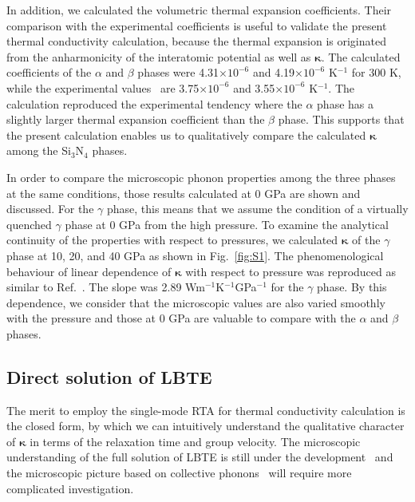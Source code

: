 \documentclass[twocolumn,amsmath,amssymb,a4paper,prb,superscriptaddress,floatfix]{revtex4-1}
\begin{document}
In addition, we calculated the volumetric thermal expansion coefficients. Their
comparison with the experimental coefficients is useful to validate the present
thermal conductivity calculation, because the thermal expansion is originated
from the anharmonicity of the interatomic potential as well as
$\boldsymbol{\kappa}$. The calculated coefficients of the $\alpha$ and $\beta$
phases were 4.31$\times 10^{-6}$ and 4.19$\times 10^{-6}$ K$^{-1}$ for 300 K,
while the experimental values~\cite{minikayev-alpha} are 3.75$\times 10^{-6}$
and 3.55$\times 10^{-6}$ K$^{-1}$. The calculation reproduced the
experimental tendency where the $\alpha$ phase has a slightly larger thermal
expansion coefficient than the $\beta$ phase. This supports that the present
calculation enables us to qualitatively compare the calculated
$\boldsymbol{\kappa}$ among the Si$_3$N$_4$ phases.

In order to compare the microscopic phonon properties among the three phases at
the same conditions, those results calculated at 0 GPa are shown and discussed.
For the $\gamma$ phase, this means that we assume the condition of a virtually
quenched $\gamma$ phase at 0 GPa from the high pressure. To examine the
analytical continuity of the properties with respect to pressures, we
calculated $\boldsymbol{\kappa}$ of the $\gamma$ phase at 10, 20, and 40 GPa as
shown in Fig.~\ref{fig:S1}. The phenomenological behaviour of linear dependence
of $\boldsymbol{\kappa}$ with respect to pressure was reproduced as similar to
Ref.~. The slope was 2.89
Wm$^{-1}$K$^{-1}$GPa$^{-1}$ for the $\gamma$ phase.  By this dependence, we
consider that the microscopic values are also varied smoothly with the pressure
and those at 0 GPa are valuable to compare with the $\alpha$ and $\beta$
phases.

\subsection{Direct solution of LBTE}

The merit to employ the single-mode RTA for thermal conductivity calculation is
the closed form, by which we can intuitively understand the qualitative
character of $\boldsymbol{\kappa}$ in terms of the relaxation time and group
velocity. The microscopic understanding of the full solution of LBTE is still
under the development~\cite{cepellotti-relaxons} and the microscopic picture
based on collective phonons~\cite{hardy-collective} will require more
complicated investigation.
\end{document}
